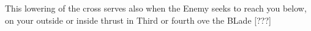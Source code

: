 This lowering of the cross serves also when the Enemy seeks to reach
you below, on your outside or inside thrust in Third or fourth ove the
BLade [???]



